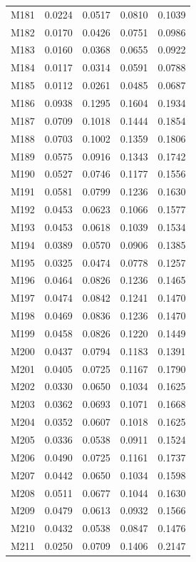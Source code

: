 \begin{longtable}{lrrrr}
M181 & 0.0224 & 0.0517 & 0.0810 & 0.1039 \\
M182 & 0.0170 & 0.0426 & 0.0751 & 0.0986 \\
M183 & 0.0160 & 0.0368 & 0.0655 & 0.0922 \\
M184 & 0.0117 & 0.0314 & 0.0591 & 0.0788 \\
M185 & 0.0112 & 0.0261 & 0.0485 & 0.0687 \\
M186 & 0.0938 & 0.1295 & 0.1604 & 0.1934 \\
M187 & 0.0709 & 0.1018 & 0.1444 & 0.1854 \\
M188 & 0.0703 & 0.1002 & 0.1359 & 0.1806 \\
M189 & 0.0575 & 0.0916 & 0.1343 & 0.1742 \\
M190 & 0.0527 & 0.0746 & 0.1177 & 0.1556 \\
M191 & 0.0581 & 0.0799 & 0.1236 & 0.1630 \\
M192 & 0.0453 & 0.0623 & 0.1066 & 0.1577 \\
M193 & 0.0453 & 0.0618 & 0.1039 & 0.1534 \\
M194 & 0.0389 & 0.0570 & 0.0906 & 0.1385 \\
M195 & 0.0325 & 0.0474 & 0.0778 & 0.1257 \\
M196 & 0.0464 & 0.0826 & 0.1236 & 0.1465 \\
M197 & 0.0474 & 0.0842 & 0.1241 & 0.1470 \\
M198 & 0.0469 & 0.0836 & 0.1236 & 0.1470 \\
M199 & 0.0458 & 0.0826 & 0.1220 & 0.1449 \\
M200 & 0.0437 & 0.0794 & 0.1183 & 0.1391 \\
M201 & 0.0405 & 0.0725 & 0.1167 & 0.1790 \\
M202 & 0.0330 & 0.0650 & 0.1034 & 0.1625 \\
M203 & 0.0362 & 0.0693 & 0.1071 & 0.1668 \\
M204 & 0.0352 & 0.0607 & 0.1018 & 0.1625 \\
M205 & 0.0336 & 0.0538 & 0.0911 & 0.1524 \\
M206 & 0.0490 & 0.0725 & 0.1161 & 0.1737 \\
M207 & 0.0442 & 0.0650 & 0.1034 & 0.1598 \\
M208 & 0.0511 & 0.0677 & 0.1044 & 0.1630 \\
M209 & 0.0479 & 0.0613 & 0.0932 & 0.1566 \\
M210 & 0.0432 & 0.0538 & 0.0847 & 0.1476 \\
M211 & 0.0250 & 0.0709 & 0.1406 & 0.2147 \\

\end{longtable}
